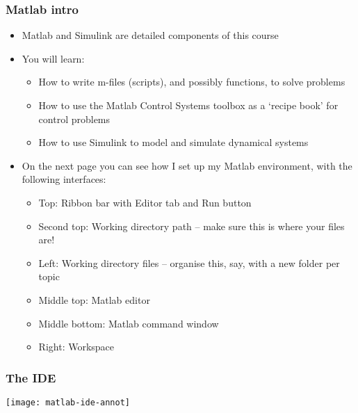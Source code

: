 \documentclass[9pt]{beamer-control}
\begin{document}
\begin{frame}
\frametitle{Matlab intro}

\begin{itemize}
\item Matlab and Simulink are detailed components of this course
\item You will learn:
\begin{itemize}
\item  How to write m-files (scripts), and possibly functions, to solve problems
\item  How to use the Matlab Control Systems toolbox as a `recipe book' for control problems
\item  How to use Simulink to model and simulate dynamical systems
\end{itemize}
\item On the next page you can see how I set up my Matlab environment, with the following interfaces:
\begin{itemize}
\item Top: Ribbon bar with Editor tab and Run button
\item Second top: Working directory path -- make sure this is where your files are!
\item Left: Working directory files -- organise this, say, with a new folder per topic
\item Middle top: Matlab editor
\item Middle bottom: Matlab command window
\item Right: Workspace
\end{itemize}
\end{itemize}
\end{frame}

\begin{frame}
\frametitle{The IDE}
\texttt{[image: matlab-ide-annot]}
\end{frame}
\end{document}
